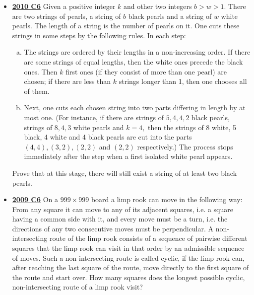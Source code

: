 \documentclass[11pt]{scrartcl}
\begin{document}
\begin{itemize}[leftmargin=*]
    \item \href{https://artofproblemsolving.com/community/c6h418689p2362306}{\textbf{2010 C6}} Given a positive integer $k$ and other two integers $b > w > 1.$ There are two strings of pearls, a string of $b$ black pearls and a string of $w$ white pearls. The length of a string is the number of pearls on it. One cuts these strings in some steps by the following rules. In each step:
\begin{enumerate}[(a)]
    \item The strings are ordered by their lengths in a non-increasing order. If there are some strings of equal lengths, then the white ones precede the black ones. Then $k$ first ones (if they consist of more than one pearl) are chosen; if there are less than $k$ strings longer than 1, then one chooses all of them.
\item Next, one cuts each chosen string into two parts differing in length by at most one. (For instance, if there are strings of $5, 4, 4, 2$ black pearls, strings of $8, 4, 3$ white pearls and $k = 4,$ then the strings of 8 white, 5 black, 4 white and 4 black pearls are cut into the parts $(4,4), (3,2), (2,2)$ and $(2,2)$ respectively.) The process stops immediately after the step when a first isolated white pearl appears.
\end{enumerate}
Prove that at this stage, there will still exist a string of at least two black pearls.
    \item \href{https://artofproblemsolving.com/community/c6h355787p1932931}{\textbf{2009 C6}} On a $999\times 999$ board a limp rook can move in the following way: From any square it can move to any of its adjacent squares, i.e. a square having a common side with it, and every move must be a turn, i.e. the directions of any two consecutive moves must be perpendicular. A non-intersecting route of the limp rook consists of a sequence of pairwise different squares that the limp rook can visit in that order by an admissible sequence of moves. Such a non-intersecting route is called cyclic, if the limp rook can, after reaching the last square of the route, move directly to the first square of the route and start over.
How many squares does the longest possible cyclic, non-intersecting route of a limp rook visit?

\newpage


\end{itemize}
\end{document}
